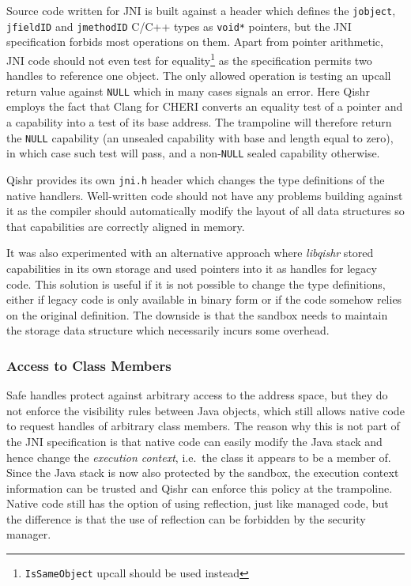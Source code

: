 \documentclass[a4paper,12pt,twoside,openright]{report}
\newcommand{\tool}[1]{\emph{#1}}
\newcommand{\lib}[1]{\tool{lib#1}}
\begin{document}
Source code written for JNI is built against a header which defines the \texttt{jobject}, \texttt{jfieldID} and \texttt{jmethodID} C/C++ types as \texttt{void*} pointers, but the JNI specification forbids most operations on them. Apart from pointer arithmetic, JNI code should not even test for equality\footnote{\texttt{IsSameObject} upcall should be used instead} as the specification permits two handles to reference one object. The only allowed operation is testing an upcall return value against \texttt{NULL} which in many cases signals an error. Here Qishr employs the fact that Clang for CHERI converts an equality test of a pointer and a capability into a test of its base address. The trampoline will therefore return the \texttt{NULL} capability (an unsealed capability with base and length equal to zero), in which case such test will pass, and a non-\texttt{NULL} sealed capability otherwise. 

Qishr provides its own \texttt{jni.h} header which changes the type definitions of the native handlers. Well-written code should not have any problems building against it as the compiler should automatically modify the layout of all data structures so that capabilities are correctly aligned in memory.

It was also experimented with an alternative approach where \lib{qishr} stored capabilities in its own storage and used pointers into it as handles for legacy code. This solution is useful if it is not possible to change the type definitions, either if legacy code is only available in binary form or if the code somehow relies on the original definition. The downside is that the sandbox needs to maintain the storage data structure which necessarily incurs some overhead.

\subsubsection{Access to Class Members}

Safe handles protect against arbitrary access to the address space, but they do not enforce the visibility rules between Java objects, which still allows native code to request handles of arbitrary class members. The reason why this is not part of the JNI specification is that native code can easily modify the Java stack and hence change the \emph{execution context}, i.e.\ the class it appears to be a member of. Since the Java stack is now also protected by the sandbox, the execution context information can be trusted and Qishr can enforce this policy at the trampoline. Native code still has the option of using reflection, just like managed code, but the difference is that the use of reflection can be forbidden by the security manager.
\end{document}
